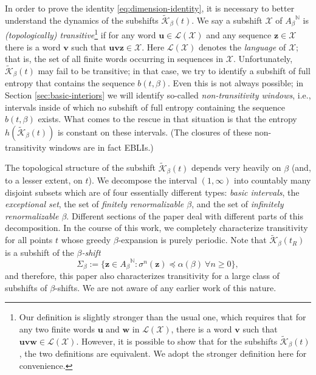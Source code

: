 \documentclass[11pt]{amsart}
\theoremstyle{definition}
\theoremstyle{remark}
\numberwithin{equation}{section}
\newcommand{\N}{\ensuremath{\mathbb{N}}}
\newcommand{\Kt}{\widetilde{\mathcal{K}}}
\newcommand{\cL}{\mathcal{L}}
\renewcommand{\u}{\mathbf{u}}
\renewcommand{\v}{\mathbf{v}}
\newcommand{\w}{\mathbf{w}}
\newcommand{\z}{\mathbf{z}}
\newcommand{\f}{\infty}
\newcommand{\lle}{\preccurlyeq}
\begin{document}
\medskip
In order to prove the identity \eqref{eq:dimension-identity}, it is necessary to better understand the dynamics of the subshifts $\Kt_\beta(t)$. We say a subshift $\mathcal{X}$ of ${A_\beta}^\N$ is {\em (topologically) transitive}\footnote{Our definition is slightly stronger than the usual one, which requires that for any two finite words $\u$ and $\w$ in $\cL(\mathcal{X})$, there is a word $\v$ such that $\u\v\w\in\cL(\mathcal{X})$. However, it is possible to show that for the subshifts $\Kt_\beta(t)$, the two definitions are equivalent. We adopt the stronger definition here for convenience.} if for any word $\u\in\cL(\mathcal{X})$ and any sequence $\z\in\mathcal{X}$ there is a word $\v$ such that $\u\v\z\in\mathcal{X}$.
Here $\cL(\mathcal{X})$ denotes the {\em language} of $\mathcal{X}$; that is, the set of all finite words occurring in sequences in $\mathcal{X}$. Unfortunately, $\Kt_\beta(t)$ may fail to be transitive; in that case, we try to identify a subshift of full entropy that contains the sequence $b(t,\beta)$. Even this is not always possible; in Section \ref{sec:basic-interiors} we will identify so-called {\em non-transitivity windows}, i.e., intervals inside of which no subshift of full entropy containing the sequence $b(t,\beta)$ exists. What comes to the rescue in that situation is that the entropy $h(\Kt_\beta(t))$ is constant on these intervals. (The closures of these non-transitivity windows are in fact EBLIs.)

The topological structure of the subshift $\Kt_\beta(t)$ depends very heavily on $\beta$ (and, to a lesser extent, on $t$). We decompose the interval {$(1,\f)$} into countably many disjoint subsets which are of four essentially different types: {\em basic intervals}, the {\em exceptional set}, the set of {\em finitely renormalizable $\beta$}, and the set of {\em infinitely renormalizable $\beta$}. Different sections of the paper deal with different parts of this decomposition. In the course of this work, we completely characterize transitivity for all points $t$ whose greedy $\beta$-expansion is purely periodic. Note that $\Kt_\beta(t_R)$ is a subshift of the {\em $\beta$-shift}
\begin{equation} \label{eq:beta-shift}
\Sigma_\beta:=\{\z\in{A_\beta}^\N: \sigma^n(\z)\lle \alpha(\beta)\ \forall n\geq 0\},
\end{equation}
and therefore, this paper also characterizes transitivity for a large class of subshifts of $\beta$-shifts. We are not aware of any earlier work of this nature.
\end{document}
